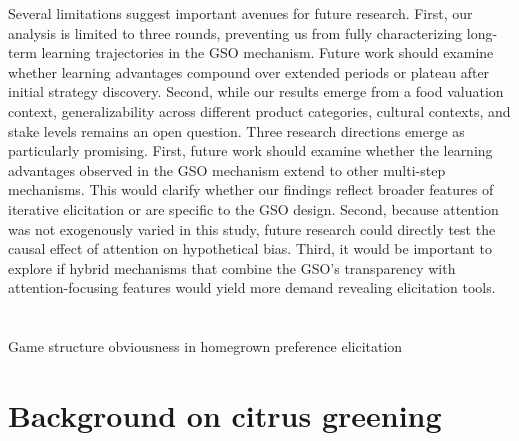 \documentclass[12pt]{article}
\begin{document}
Several limitations suggest important avenues for future research. First, our analysis is limited to three rounds, preventing us from fully characterizing long-term learning trajectories in the GSO mechanism. Future work should examine whether learning advantages compound over extended periods or plateau after initial strategy discovery. Second, while our results emerge from a food valuation context, generalizability across different product categories, cultural contexts, and stake levels remains an open question.
Three research directions emerge as particularly promising. First, future work should examine whether the learning advantages observed in the GSO mechanism extend to other multi-step mechanisms. This would clarify whether our findings reflect broader features of iterative elicitation or are specific to the GSO design. Second, because attention was not exogenously varied in this study, future research could directly test the causal effect of attention on hypothetical bias. Third, it would be important to explore if hybrid mechanisms that combine the GSO’s transparency with attention-focusing features would yield more demand revealing elicitation tools.








\newpage
	\singlespacing
	\appendix
	\setcounter{table}{0}
	\setcounter{figure}{0}
    \renewcommand{\thesection}{A\arabic{section}}
	\renewcommand{\thetable}{A\arabic{table}}
	\renewcommand{\thefigure}{A\arabic{figure}}
	\setcounter{page}{1}
	\renewcommand{\thesubsection}{\Alph{subsection}}

	\section*{}
	{\centering \LARGE Game structure obviousness in homegrown preference elicitation
		
		\vspace{0.5cm}
		\renewcommand*{\thefootnote}{\fnsymbol{footnote}}
		\setcounter{footnote}{0}
		
		\large
        }

\section{\textbf{Background on citrus greening}
\label{tab:background}}
\end{document}
